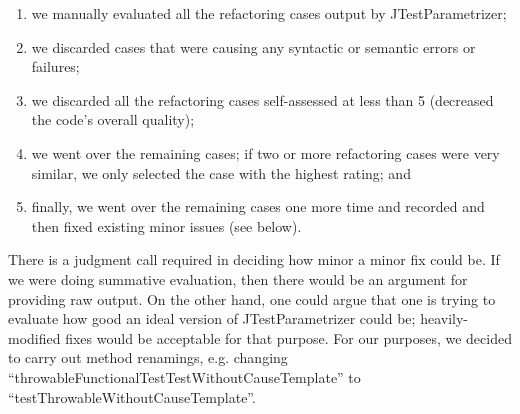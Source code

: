  \begin{enumerate}

  \item \label{item:selecting-pr-step-one} we manually evaluated all the refactoring cases output by JTestParametrizer;

  \item \label{item:selecting-pr-step-two} we discarded cases that were causing any syntactic or semantic errors or failures;

  \item \label{item:selecting-pr-step-three} we discarded all the refactoring cases self-assessed at less than 5 (decreased the code's overall quality);
  
  \item \label{item:selecting-representative} we went over the remaining cases; if two or more refactoring cases were very similar, we only selected the case with the highest rating; and
  
  \item \label{item:minor-changes} finally, we went over the remaining cases one more time and recorded and then fixed existing minor issues (see below). 
\end{enumerate}

There is a judgment call required in deciding how minor a minor fix could be. If we were doing summative evaluation, then there would be an argument for providing raw output. On the other hand, one could argue that one is trying to evaluate how good an ideal version of JTestParametrizer could be; heavily-modified fixes would be acceptable for that purpose. For our purposes, we decided to carry out method renamings, e.g. changing ``throwableFunctionalTestTestWithoutCauseTemplate'' to ``testThrowableWithoutCauseTemplate''.





  
